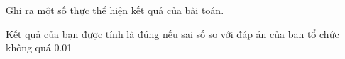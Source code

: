 Ghi ra một số thực thể hiện kết quả của bài toán.

Kết quả của bạn được tính là đúng nếu sai số so với đáp án của ban tổ chức không quá 0.01

\